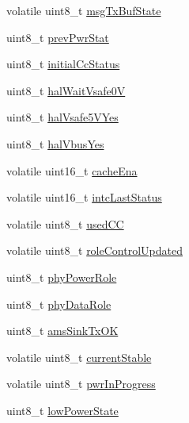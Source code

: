 \begin{DoxyCompactItemize}
volatile uint8\-\_\-t \hyperlink{struct____pd__phy__tcpc__instance___a24037bc939fa4ef146806af07f94633d}{msg\-Tx\-Buf\-State}
\item 
uint8\-\_\-t \hyperlink{struct____pd__phy__tcpc__instance___ae7ea8877aeb1575b2965df9314d5a2cf}{prev\-Pwr\-Stat}
\item 
uint8\-\_\-t \hyperlink{struct____pd__phy__tcpc__instance___a3516be0335f933f899fb28a9437f5bdc}{initial\-Cc\-Status}
\item 
uint8\-\_\-t \hyperlink{struct____pd__phy__tcpc__instance___a570de85ac09a6b1c2846340c62ca6db6}{hal\-Wait\-Vsafe0\-V}
\item 
uint8\-\_\-t \hyperlink{struct____pd__phy__tcpc__instance___a4f5e58eba28f763faec84e6cf21f3bec}{hal\-Vsafe5\-V\-Yes}
\item 
uint8\-\_\-t \hyperlink{struct____pd__phy__tcpc__instance___adaf45c602e807d187285f47600ba9f22}{hal\-Vbus\-Yes}
\item 
volatile uint16\-\_\-t \hyperlink{struct____pd__phy__tcpc__instance___acb8b5bda19e51013f2e9b53a5210a49b}{cache\-Ena}
\item 
volatile uint16\-\_\-t \hyperlink{struct____pd__phy__tcpc__instance___a58fe51ff1ebabdf028e6b24925d0d612}{intc\-Last\-Status}
\item 
volatile uint8\-\_\-t \hyperlink{struct____pd__phy__tcpc__instance___a411ad2f7bc90a10a62a5ec1f466a4a97}{used\-C\-C}
\item 
volatile uint8\-\_\-t \hyperlink{struct____pd__phy__tcpc__instance___a12f900cf19375e18339d43ee8ec60b55}{role\-Control\-Updated}
\item 
uint8\-\_\-t \hyperlink{struct____pd__phy__tcpc__instance___af77c96ac21768f2e8a54fad69f97e96f}{phy\-Power\-Role}
\item 
uint8\-\_\-t \hyperlink{struct____pd__phy__tcpc__instance___a5963a6c4377fd4b3782f880eb70a314e}{phy\-Data\-Role}
\item 
uint8\-\_\-t \hyperlink{struct____pd__phy__tcpc__instance___a68e310d1771e6f32f6d1b1b9f5c00aa8}{ams\-Sink\-Tx\-O\-K}
\item 
volatile uint8\-\_\-t \hyperlink{struct____pd__phy__tcpc__instance___a0a78bbebf4ee073519c2250c856c58da}{current\-Stable}
\item 
volatile uint8\-\_\-t \hyperlink{struct____pd__phy__tcpc__instance___aa594b019548753b279b058071e537257}{pwr\-In\-Progress}
\item 
uint8\-\_\-t \hyperlink{struct____pd__phy__tcpc__instance___a19a01f5c9205bebfac2a3514249db1fc}{low\-Power\-State}
\item 

\end{DoxyCompactItemize}
